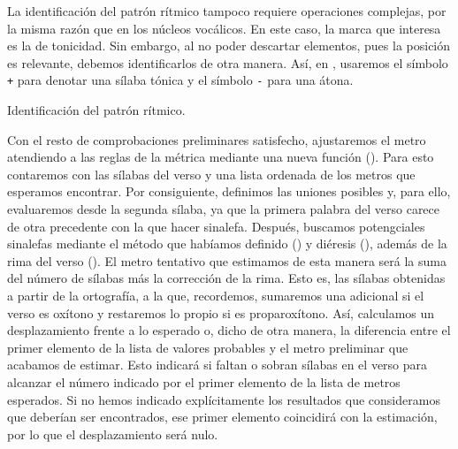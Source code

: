 La identificación del patrón rítmico tampoco requiere operaciones complejas, por la misma razón que en los núcleos vocálicos. En este caso, la marca que interesa es la de tonicidad. Sin embargo, al no poder descartar elementos, pues la posición es relevante, debemos identificarlos de otra manera. Así, en , usaremos el símbolo \texttt{+} para denotar una sílaba tónica y el símbolo \texttt{-} para una átona.

\begin{algorithm}[!ht]
	\caption{Identificación del patrón rítmico.}\label{list:VerSeMetre21}
\end{algorithm}

Con el resto de comprobaciones preliminares satisfecho, ajustaremos el metro atendiendo a las reglas de la métrica mediante una nueva función (). Para esto contaremos con las sílabas del verso y una lista ordenada de los metros que esperamos encontrar. Por consiguiente, definimos las uniones posibles y, para ello, evaluaremos desde la segunda sílaba, ya que la primera palabra del verso carece de otra precedente con la que hacer sinalefa. Después, buscamos potengciales sinalefas mediante el método que habíamos definido () y diéresis (), además de la rima del verso (). El metro tentativo que estimamos de esta manera será la suma del número de sílabas más la corrección de la rima. Esto es, las sílabas obtenidas a partir de la ortografía, a la que, recordemos, sumaremos una adicional si el verso es oxítono y restaremos lo propio si es proparoxítono. Así, calculamos un desplazamiento frente a lo esperado o, dicho de otra manera, la diferencia entre el primer elemento de la lista de valores probables y el metro preliminar que acabamos de estimar. Esto indicará si faltan o sobran sílabas en el verso para alcanzar el número indicado por el primer elemento de la lista de metros esperados. Si no hemos indicado explícitamente los resultados que consideramos que deberían ser encontrados, ese primer elemento coincidirá con la estimación, por lo que el desplazamiento será nulo.

